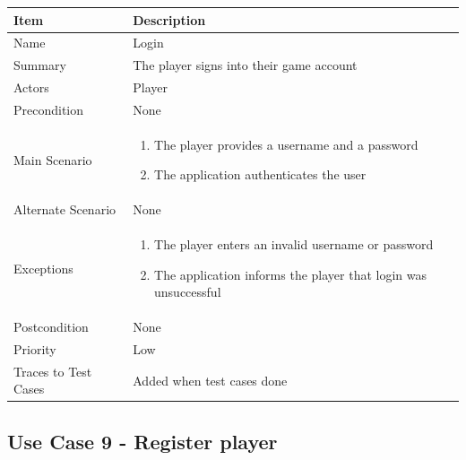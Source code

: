 \documentclass[12pt]{article}
\begin{document}
\begin{center}
\setlength{\tabcolsep}{18pt}
\renewcommand{\arraystretch}{1.3}
\begin{tabular}{ |p{3.4cm}|p{10cm}| }
    \hline
    
   \textbf{Item} & \textbf{Description} \\
    \hline
    Name & Login \\
    \hline
    Summary & The player signs into their game account \\
    \hline
    Actors & Player \\
    \hline
    Precondition & None \\
    \hline
    Main Scenario &     
    \vspace*{-0.1in}
    \begin{enumerate}[leftmargin=0.2in]
        \item The player provides a username and a password
        \item The application authenticates the user
    
       
    \end{enumerate}  \\
    \hline
    Alternate Scenario & None \\
    \hline
    Exceptions & 
    \vspace*{-0.1in}
    \begin{enumerate}[leftmargin=0.2in]
        \item The player enters an invalid username or password
        \item The application informs the player that login was unsuccessful
    \end{enumerate}  \\
    \hline
    Postcondition & None \\
    \hline
    Priority & Low  \\
    \hline
    \small{Traces to Test Cases} & Added when test cases done  \\
    \hline
\end{tabular}
\end{center}

\newpage


\subsection{Use Case 9 - Register player}
\end{document}
